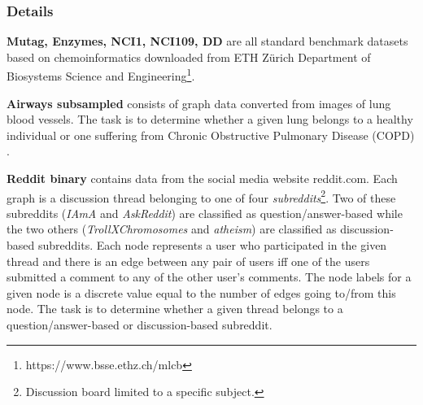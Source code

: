 \documentclass{article}
\begin{document}
\begin{table}[H]
		\centering
		\hspace*{-0.7in}
	\caption{\textit{Dataset specifications}}
	\label{table:data-sets}
\end{table}

\subsubsection{Details}
\textbf{Mutag, Enzymes, NCI1, NCI109, DD} are all standard benchmark datasets based on chemoinformatics downloaded from ETH Zürich Department of Biosystems Science and Engineering\footnote{https://www.bsse.ethz.ch/mlcb}.

\textbf{Airways subsampled} consists of graph data converted from images of lung blood vessels. The task is to determine whether a given lung belongs to a healthy individual or one suffering from Chronic Obstructive Pulmonary Disease (COPD) \cite{graphhopper}.

\textbf{Reddit binary} \cite{yanardag} contains data from the social media website reddit.com. Each graph is a discussion thread belonging to one of four \textit{subreddits}\footnote{Discussion board limited to a specific subject.}. Two of these subreddits (\textit{IAmA} and \textit{AskReddit}) are classified as question/answer-based while the two others (\textit{TrollXChromosomes} and \textit{atheism}) are classified as discussion-based subreddits. Each node represents a user who participated in the given thread and there is an edge between any pair of users iff one of the users submitted a comment to any of the other user's comments. The node labels for a given node is a discrete value equal to the number of edges going to/from this node. The task is to determine whether a given thread belongs to a question/answer-based or discussion-based subreddit.
\end{document}
